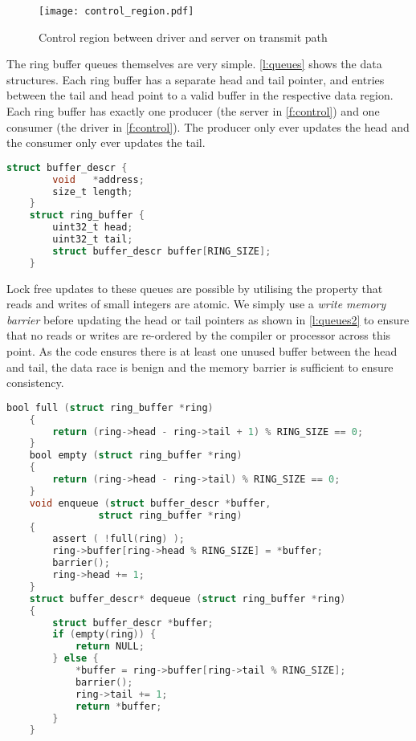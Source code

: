 \begin{figure}[h]
    \centering
    \texttt{[image: control\_region.pdf]}
    \caption{Control region between driver and server on transmit path \cite{Parker_22:sddf}}
    \label{f:control}
\end{figure}

The ring buffer queues themselves are very simple. \autoref{l:queues} shows the data structures. Each
ring buffer has a separate head and tail pointer, and entries between the tail and head point to a valid buffer
in the respective data region. Each ring buffer has exactly one producer (the server in \autoref{f:control})
and one consumer (the driver in \autoref{f:control}). The producer
only ever updates the head and the consumer only ever updates the tail.

\begin{lstlisting}[tabsize=2, language=C, caption={Ring Buffer Queues},frame=tb, label={l:queues}, captionpos=b]
    struct buffer_descr {
        void   *address;
        size_t length;
    }
    struct ring_buffer {
        uint32_t head;
        uint32_t tail;
        struct buffer_descr buffer[RING_SIZE];
    }
\end{lstlisting}

Lock free updates to these queues are possible by utilising the property that reads and writes of small
integers are atomic. We simply use a \emph{write memory barrier} before updating the head or tail pointers
as shown in \autoref{l:queues2} to ensure that no reads or writes are re-ordered by the compiler or
processor across this point. As the code ensures there is at least one unused buffer between the head and tail,
the data race is benign and the memory barrier is sufficient to ensure consistency.

\begin{minipage}{\textwidth}
\centering
\begin{lstlisting}[tabsize=2, language=C, caption={Ring Buffer Queue Management},frame=tb, 
                    label={l:queues2}, captionpos=b]
    bool full (struct ring_buffer *ring)
    {
        return (ring->head - ring->tail + 1) % RING_SIZE == 0;
    }
    bool empty (struct ring_buffer *ring)
    {
        return (ring->head - ring->tail) % RING_SIZE == 0;
    }
    void enqueue (struct buffer_descr *buffer, 
                struct ring_buffer *ring) 
    {
        assert ( !full(ring) );
        ring->buffer[ring->head % RING_SIZE] = *buffer;
        barrier();
        ring->head += 1;
    }
    struct buffer_descr* dequeue (struct ring_buffer *ring)
    {
        struct buffer_descr *buffer;
        if (empty(ring)) {
            return NULL;
        } else {
            *buffer = ring->buffer[ring->tail % RING_SIZE];
            barrier();
            ring->tail += 1;
            return *buffer;
        }
    }
\end{lstlisting}
\end{minipage}

